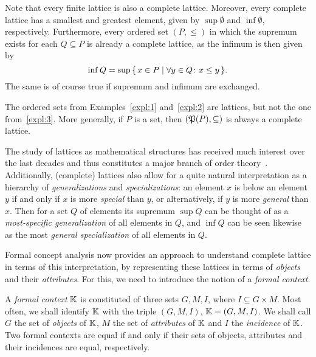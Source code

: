 Note that every finite lattice is also a complete lattice.  Moreover, every complete
lattice has a smallest and greatest element, given by $\sup\emptyset$ and $\inf\emptyset$,
respectively.  Furthermore, every ordered set $(P, \le)$ in which the supremum exists for
each $Q \subseteq P$ is already a complete lattice, as the infimum is then given by
\begin{equation*}
  \inf Q = \sup{\ensuremath{\{\, x \in P \mid \forall y \in Q \colon x \le y \,\}}}.
\end{equation*}
The same is of course true if supremum and infimum are exchanged.

The ordered sets from Examples~\ref{expl:1} and~\ref{expl:2} are lattices, but not the one
from~\ref{expl:3}.  More generally, if $P$ is a set, then $({\mathfrak{P}(P)}, \subseteq)$ is
always a complete lattice.

The study of lattices as mathematical structures has received much interest over the last
decades and thus constitutes a major branch of order theory~\cite{Gratzer}.  Additionally,
(complete) lattices also allow for a quite natural interpretation as a hierarchy of
\emph{generalizations} and \emph{specializations}: an element $x$ is below an element $y$
if and only if $x$ is more \emph{special} than $y$, or alternatively, if $y$ is more
\emph{general} than $x$.  Then for a set $Q$ of elements its supremum $\sup Q$ can be
thought of as a \emph{most-specific generalization} of all elements in $Q$, and $\inf Q$
can be seen likewise as the most \emph{general specialization} of all elements in $Q$.

Formal concept analysis now provides an approach to understand complete lattice in terms
of this interpretation, by representing these lattices in terms of \emph{objects} and
their \emph{attributes}.  For this, we need to introduce the notion of a \emph{formal
  context}.

\begin{Definition}
  \label{def:formal-context}
  A \emph{formal context} ${\mathbb{K}}$ is constituted of three sets $G, M, I$, where $I
  \subseteq G \times M$.  Most often, we shall identify ${\mathbb{K}}$ with the triple $(G, M,
  I)$, \ie ${\mathbb{K}} = (G, M, I)$.  We shall call $G$ the set of \emph{objects} of ${\mathbb{K}}$,
  $M$ the set of \emph{attributes} of ${\mathbb{K}}$ and $I$ the \emph{incidence} of ${\mathbb{K}}$.
  Two formal contexts are equal if and only if their sets of objects, attributes and their
  incidences are equal, respectively.
\end{Definition}

